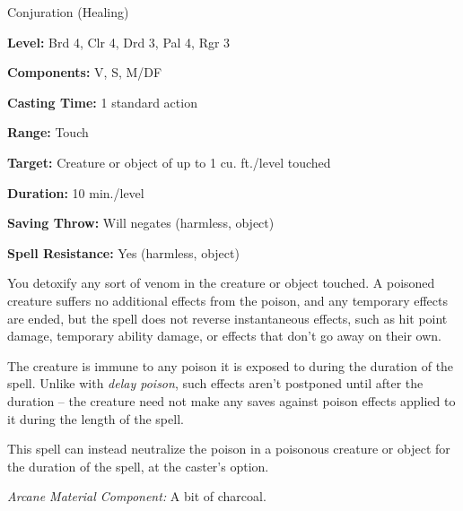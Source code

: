 
Conjuration (Healing)

\textbf{Level:} Brd 4, Clr 4, Drd 3, Pal 4, Rgr 3

\textbf{Components:} V, S, M/DF

\textbf{Casting Time:} 1 standard action

\textbf{Range:} Touch

\textbf{Target:} Creature or object of up to 1 cu. ft./level touched

\textbf{Duration:} 10 min./level

\textbf{Saving Throw:} Will negates (harmless, object)

\textbf{Spell Resistance:} Yes (harmless, object)

You detoxify any sort of venom in the creature or object touched. A poisoned creature 
suffers no additional effects from the poison, and any temporary effects are ended, 
but the spell does not reverse instantaneous effects, such as hit point damage, 
temporary ability damage, or effects that don't go away on their own.

The creature is immune to any poison it is exposed to during the duration of the 
spell. Unlike with \textit{delay poison}, such effects aren't postponed until after 
the duration  -- the creature need not make any saves against poison effects applied 
to it during the length of the spell.

This spell can instead neutralize the poison in a poisonous creature or object 
for the duration of the spell, at the caster's option.

\textit{Arcane Material Component:} A bit of charcoal.

